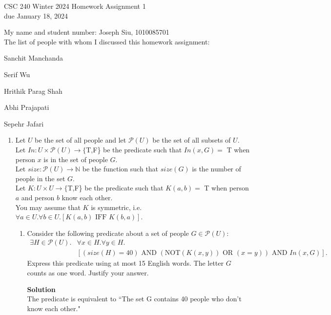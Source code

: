 \documentclass[12pt]{article}
\newcommand{\nnot}{\mathrm{NOT}}
\newcommand{\aand}{\,\,\mathrm{AND}\,\,}
\newcommand{\oor}{\,\,\mathrm{OR}\,\,}
\newcommand{\iif}{\,\,\mathrm{IFF}\,\,}
\newcommand{\nats}{\mathbb{N}}
\begin{document}
\begin{center}
{\Large CSC 240 Winter 2024 Homework Assignment 1}\\
due January 18, 2024
\end{center}

My name and student number: Joseph Siu, 1010085701\\
The list of people with whom I discussed this homework assignment:

Sanchit Manchanda

Serif Wu

Hrithik Parag Shah

Abhi Prajapati

Sepehr Jafari


\begin{enumerate}
\item
Let $U$ be the set of all people and let $\mathcal{P}(U)$ be the set of all subsets of $U$.\\
Let $In: U \times \mathcal{P}(U)  \rightarrow \{$T,F\} be the predicate such that 
$In(x,G) = $ T when person $x$ is in the set of people $G$.\\
Let $size:\mathcal{P}(U) \rightarrow \nats$ be the function 
such that $size(G)$ is the number of people in the set $G$.\\
Let $K: U \times U \to \{$T,F\} be the predicate such that 
$K(a,b) =$ T when person $a$ and person $b$ know each other.\\
You may assume that $K$ is symmetric, i.e.~$\forall a \in U. \forall b \in U. [K(a,b) \iif  K(b,a)]$.

\begin{enumerate}
\item
Consider the following predicate about a set of people $G \in \mathcal{P}(U)$:
\begin{align*}
\exists H \in \mathcal{P}(U). & \forall x \in H. \forall y \in H.\\
& [(size(H)= 40)  \aand  (\nnot(K(x,y)) \oor (x=y)) \aand In(x , G)].
 \end{align*}
Express this predicate using at most 15 English words. The letter $G$ counts as one word.
Justify your answer. 
    
\vspace{.25in}\textbf{Solution}\vspace{.10in}\\

The predicate is equivalent to ``The set G contains 40 people who don't know each other."\\


\end{enumerate}
\end{enumerate}
\end{document}
